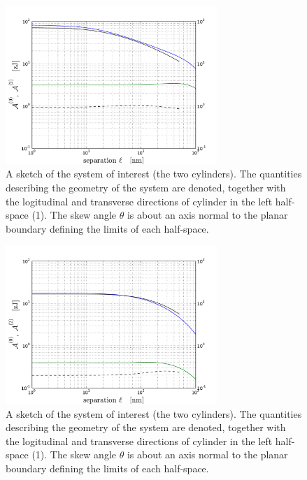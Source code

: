 \documentclass[onecolumn,letterpaper,amsmath,amssymb,floatfix,aps,superscriptaddress]{revtex4}
\begin{document}
\begin{figure}
\centerline{\includegraphics[width=8cm]{140309_93w93_GH_skew_ret_A0_A2.pdf}}
\caption{A sketch of the system of interest (the two cylinders). The quantities describing the geometry of the system are 
denoted, together with the logitudinal and transverse directions of cylinder in the left half-space (1). The skew angle $\theta$ is about an axis normal to the planar boundary defining the limits of each half-space.
}
\label{fig:sketch}
\end{figure}

\begin{figure}
\centerline{\includegraphics[width=8cm]{140309_290w290_GH_skew_ret_A0_A2.pdf}}
\caption{A sketch of the system of interest (the two cylinders). The quantities describing the geometry of the system are 
denoted, together with the logitudinal and transverse directions of cylinder in the left half-space (1). The skew angle $\theta$ is about an axis normal to the planar boundary defining the limits of each half-space.
}
\label{fig:sketch}
\end{figure}

\end{document}
